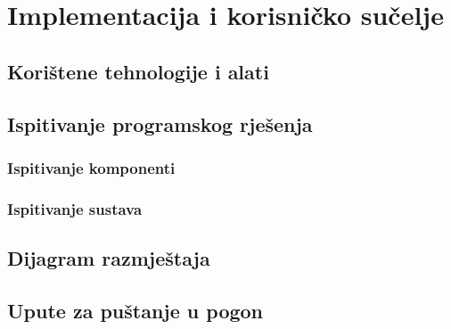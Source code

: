 \chapter{Implementacija i korisničko sučelje}
		
		
		\section{Korištene tehnologije i alati}
			
			\eject 
		
	
		\section{Ispitivanje programskog rješenja}
			
			\subsection{Ispitivanje komponenti}
		
			
			\subsection{Ispitivanje sustava}
			
			\eject 
		
		
		\section{Dijagram razmještaja}
			
			\eject 
		
		\section{Upute za puštanje u pogon}
		
			\eject 